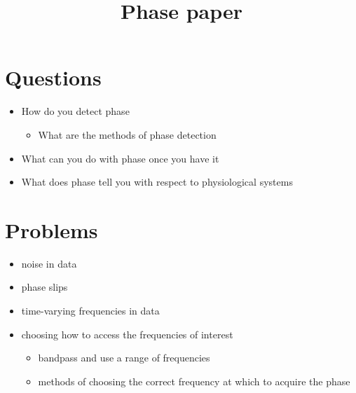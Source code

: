 \documentclass{article}
\title{Phase paper}
\author{}
\date{}
\begin{document}
\maketitle

\section{Questions}

\begin{itemize}
\item How do you detect phase
\begin{itemize}
\item What are the methods of phase detection
\end{itemize}
\item What can you do with phase once you have it
\item What does phase tell you with respect to physiological systems
\end{itemize}

\section{Problems}

\begin{itemize}
\item noise in data
\item phase slips
\item time-varying frequencies in data
\item choosing how to access the frequencies of interest
\begin{itemize}
\item bandpass and use a range of frequencies
\item methods of choosing the correct frequency at which to acquire the phase
\end{itemize}
\end{itemize}
\end{document}
